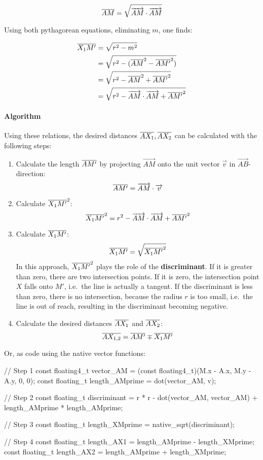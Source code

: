 \begin{equation} \overline{AM} = \sqrt{\overrightarrow{AM} \cdot \overrightarrow{AM}} \end{equation}

Using both pythagorean equations, eliminating \(m\), one finds:

\begin{equation}\begin{split}
  \overline{X_1 M'} &= \sqrt{r^2 - m^2} \\
    &= \sqrt{r^2 - (\overline{AM}^2 - \overline{AM'}^2)} \\
    &= \sqrt{r^2 - \overline{AM}^2 + \overline{AM'}^2} \\
    &= \sqrt{r^2 - \overrightarrow{AM} \cdot \overrightarrow{AM} + \overline{AM'}^2}
\end{split}\end{equation}

\paragraph{Algorithm}

Using these relations, the desired distances \(\overline{AX_1}, \overline{AX_2}\)
can be calculated with the following steps:

\begin{enumerate}
\def\labelenumi{\arabic{enumi}.}
\tightlist
\item
  Calculate the length \(\overline{AM'}\) by projecting \(\vec{AM}\) onto the
  unit vector \(\vec{v}\) in \(\vec{AB}\)-direction:
  \[ \overline{AM'} = \overrightarrow{AM} \cdot \overrightarrow{v} \]
\item
  Calculate \(\overline{X_1M'}^2\):
  \[ \overline{X_1 M'}^2 = r^2 - \overrightarrow{AM} \cdot \overrightarrow{AM} + \overline{AM'}^2 \]
\item
  Calculate \(\overline{X_1M'}\): \[ \overline{X_1 M'} = \sqrt{\overline{X_1 M'}^2} \]
  In this approach, \(\overline{X_1M'}^2\) plays the role of the
  \textbf{discriminant}. If it is greater than zero, there are two
  intersection points. If it is zero, the intersection point \(X\) falls
  onto \(M'\), i.e.~the line is actually a tangent. If the discriminant
  is less than zero, there is no intersection, because the radius \(r\)
  is too small, i.e.~the line is out of reach, resulting in the
  discriminant becoming negative.
\item
  Calculate the desired distances \(\overline{AX_1}\) and \(\overline{AX_2}\):
  \[ \overline{A X_{1,2}} = \overline{A M'} \mp \overline{X_1 M'} \]
\end{enumerate}

Or, as  code using the  native vector functions:

\begin{ccode}
  // Step 1
  const floating4_t vector_AM = (const floating4_t)(M.x - A.x, M.y - A.y, 0, 0);
  const floating_t length_AMprime = dot(vector_AM, v);

  // Step 2
  const floating_t discriminant = r * r - dot(vector_AM, vector_AM) + length_AMprime * length_AMprime;

  // Step 3
  const floating_t length_XMprime = native_sqrt(discriminant);

  // Step 4
  const floating_t length_AX1 = length_AMprime - length_XMprime;
  const floating_t length_AX2 = length_AMprime + length_XMprime;
\end{ccode}
